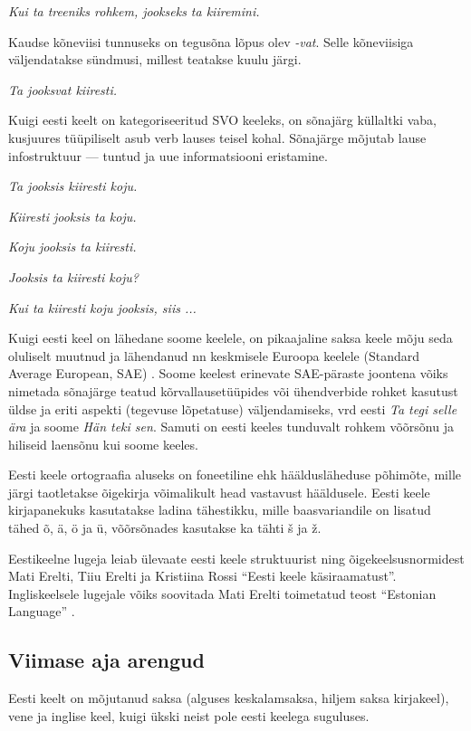 \documentclass[]{../metanetpaper}
\begin{document}
\begin{multicols}{2}
\textit{Kui ta treeniks rohkem, jookseks ta kiire\-mini.}

Kaudse kõneviisi tunnuseks on tegusõna lõpus olev \textit{-vat}. 
Selle kõneviisiga väljendatakse sündmusi, millest teatakse kuulu järgi.

\textit{Ta jooksvat kiiresti.} 

Kuigi eesti keelt on kategoriseeritud SVO keeleks, on sõnajärg küllaltki vaba, kusjuures tüüpiliselt asub verb lauses teisel kohal. 
Sõnajärge mõjutab lause infostruktuur --- tuntud ja uue informatsiooni eristamine.

\textit{Ta jooksis kiiresti koju.} 	

\textit{Kiiresti jooksis ta koju.} 	

\textit{Koju jooksis ta kiiresti.} 	

\textit{Jooksis ta kiiresti koju?} 	

\textit{Kui ta kiiresti koju jooksis, siis ...} 

Kuigi eesti keel on lähedane soome keelele, on pikaajaline saksa keele mõju seda oluliselt muutnud ja lähendanud nn kesk\-misele Euroopa keelele (Standard Average European, SAE) \cite{Metslang09}.
Soome keelest erinevate SAE-päraste joontena võiks nimetada sõnajärge teatud kõrvallausetüüpides või ühendverbide rohket kasutust üldse ja eriti aspekti (tegevuse lõpetatuse) väljendamiseks, vrd eesti \textit{Ta tegi selle ära} ja soome \textit{Hän teki sen}. 
Samuti on eesti keeles tunduvalt rohkem  võõrsõnu ja hiliseid laensõnu kui soome keeles.

Eesti keele ortograafia aluseks on foneetiline ehk hääldusläheduse põhimõte, mille järgi taotletakse õigekirja võimalikult head vastavust hääldusele. 
Eesti keele kirjapanekuks kasutatakse ladina tähestikku, mille baasvariandile on lisatud tähed õ, ä, ö ja ü, võõrsõnades kasutakse ka tähti š ja ž.

Eestikeelne lugeja leiab ülevaate eesti keele struktuurist ning
õigekeelsusnormidest Mati Erelti, Tiiu Erelti ja Kristiina Rossi
``Eesti keele käsiraamatust''\cite{ereltetal2007}. %
Ingliskeelsele lugejale võiks soovitada Mati Erelti toimetatud teost ``Estonian Language'' \cite{erelt2003}. %


\subsection{Viimase aja arengud}

Eesti keelt on mõjutanud saksa (alguses keskalamsaksa, hiljem saksa kirjakeel), vene ja inglise keel, kuigi ükski neist pole eesti keelega suguluses.


\end{multicols}
\end{document}
